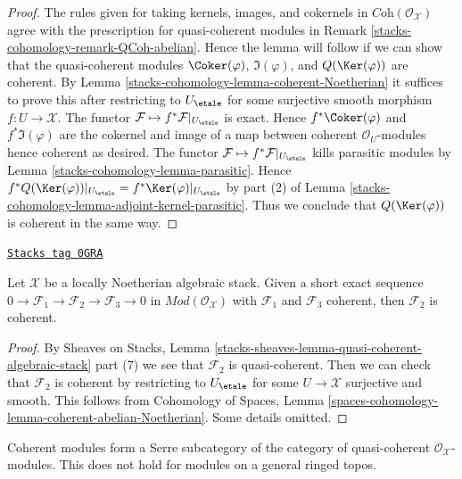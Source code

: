 \begin{proof}
The rules given for taking kernels, images, and cokernels in
$\textit{Coh}(\mathcal{O}_\mathcal{X})$ agree with the prescription
for quasi-coherent modules in Remark \ref{stacks-cohomology-remark-QCoh-abelian}.
Hence the lemma will follow if we can show that the quasi-coherent modules
$\Coker(\varphi)$, $\Im(\varphi)$, and $Q(\Ker(\varphi))$ are coherent.
By Lemma \ref{stacks-cohomology-lemma-coherent-Noetherian} it suffices to prove this after
restricting to $U_\etale$ for some surjective smooth morphism
$f : U \to \mathcal{X}$. The functor
$\mathcal{F} \mapsto f^*\mathcal{F}|_{U_\etale}$
is exact. Hence $f^*\Coker(\varphi)$ and $f^*\Im(\varphi)$ are
the cokernel and image of a map between coherent $\mathcal{O}_U$-modules
hence coherent as desired. The functor
$\mathcal{F} \mapsto f^*\mathcal{F}|_{U_\etale}$
kills parasitic modules by Lemma \ref{stacks-cohomology-lemma-parasitic}.
Hence $f^*Q(\Ker(\varphi))|_{U_\etale} = f^*\Ker(\varphi)|_{U_\etale}$
by part (2) of Lemma \ref{stacks-cohomology-lemma-adjoint-kernel-parasitic}.
Thus we conclude that $Q(\Ker(\varphi))$ is coherent in the same way.
\end{proof}

\begin{lemma}
\label{stacks-cohomology-lemma-extension-coherent}
\href{https://stacks.math.columbia.edu/tag/0GRA}{\texttt{Stacks tag 0GRA}}

Let $\mathcal{X}$ be a locally Noetherian algebraic stack.
Given a short exact sequence
$0 \to \mathcal{F}_1 \to \mathcal{F}_2 \to \mathcal{F}_3 \to 0$
in $\textit{Mod}(\mathcal{O}_\mathcal{X})$
with $\mathcal{F}_1$ and $\mathcal{F}_3$ coherent, then
$\mathcal{F}_2$ is coherent.
\end{lemma}

\begin{proof}
By Sheaves on Stacks, Lemma
\ref{stacks-sheaves-lemma-quasi-coherent-algebraic-stack} part (7) we see that
$\mathcal{F}_2$ is quasi-coherent. Then we can check that
$\mathcal{F}_2$ is coherent by restricting to $U_\etale$
for some $U \to \mathcal{X}$ surjective and smooth.
This follows from Cohomology of Spaces, Lemma
\ref{spaces-cohomology-lemma-coherent-abelian-Noetherian}.
Some details omitted.
\end{proof}

Coherent modules form a Serre subcategory of the
category of quasi-coherent $\mathcal{O}_\mathcal{X}$-modules.
This does not hold for modules on a general ringed topos.

